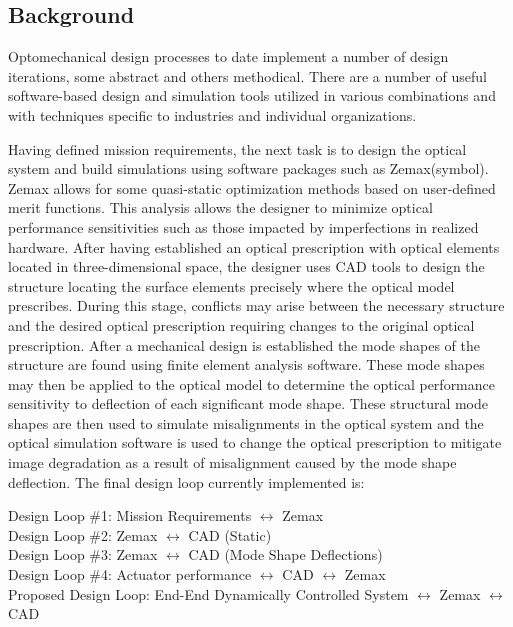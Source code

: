 \documentclass{aiaa-tc}
\begin{document}
\subsection{Background}

Optomechanical design processes to date implement a number of design iterations, some abstract and others methodical. There are a number of useful software-based design and simulation tools utilized in various combinations and with techniques specific to industries and individual organizations.

Having defined mission requirements, the next task is to design the optical system and build simulations using software packages such as Zemax(symbol). Zemax allows for some quasi-static optimization methods based on user-defined merit functions. This analysis allows the designer to minimize optical performance sensitivities such as those impacted by imperfections in realized hardware. After having established an optical prescription with optical elements located in three-dimensional space, the designer uses CAD tools to design the structure locating the surface elements precisely where the optical model prescribes. During this stage, conflicts may arise between the necessary structure and the desired optical prescription requiring changes to the original optical prescription. After a mechanical design is established the mode shapes of the structure are found using finite element analysis software. These mode shapes may then be applied to the optical model to determine the optical performance sensitivity to deflection of each significant mode shape. These structural mode shapes are then used to simulate misalignments in the optical system and the optical simulation software is used to change the optical prescription to mitigate image degradation as a result of misalignment caused by the mode shape deflection. The final design loop currently implemented is:

\begin{tabbing}
Design Loop \#1: Mission Requirements $\leftrightarrow$ Zemax \\
Design Loop \#2: Zemax $\leftrightarrow$ CAD (Static) \\
Design Loop \#3: Zemax $\leftrightarrow$ CAD (Mode Shape Deflections) \\
Design Loop \#4: Actuator performance $\leftrightarrow$ CAD $\leftrightarrow$ Zemax \\
Proposed Design Loop: End-End Dynamically Controlled System $\leftrightarrow$ Zemax $\leftrightarrow$ CAD
\end{tabbing}
\end{document}
